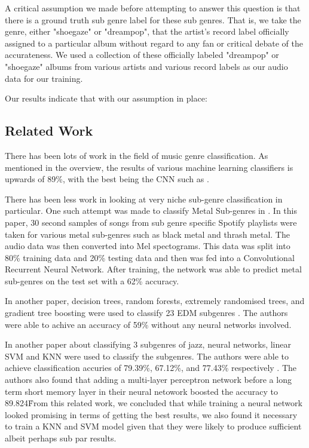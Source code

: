 \documentclass[letterpaper, 12 pt, conference]{ieeeconf}  %
\begin{document}
A critical assumption we made before attempting to answer this question is that there is a ground truth sub genre label for these sub genres. That is, we take the genre, either "shoegaze" or "dreampop", that the artist's record label officially assigned to a particular album without regard to any fan or critical debate of the accurateness. We used a collection of these officially labeled "dreampop" or "shoegaze" albums from various artists and various record labels as our audio data for our training.

Our results indicate that with our assumption in place: 




\subsection{Related Work}


There has been lots of work in the field of music genre classification. As mentioned in the overview, the results of various machine learning classifiers is upwards of 89\%, with the best being the CNN such as \cite{c4}. 

There has been less work in looking at very niche sub-genre classification in particular. One such attempt was made to classify Metal Sub-genres in \cite{c5}. In this paper, 30 second samples of songs from sub genre specific Spotify playlists were taken for various metal sub-genres such as black metal and thrash metal. The audio data was then converted into Mel spectograms. This data was split into 80\% training data and 20\% testing data and then was fed into a Convolutional Recurrent Neural Network. After training, the network was able to predict metal sub-genres on the test set with a 62\% accuracy. 

In another paper, decision trees, random forests, extremely randomised trees, and gradient tree boosting were used to classify 23 EDM subgenres \cite{c6}. The authors were able to achive an accuracy of 59\% without any neural networks involved.

In another paper about classifying 3 subgenres of jazz, neural networks, linear SVM and KNN were used to classify the subgenres. The authors were able to achieve classification accuries of 79.39\%, 67.12\%, and 77.43\%  respectively \cite{c7}. The authors also found that adding a multi-layer perceptron network before a long term short memory layer in their neural netowork boosted the accuracy to 89.824\.%

From this related work, we concluded that while training a neural network looked promising in terms of getting the best results, we also found it necessary to train a KNN and SVM model given that they were likely to produce sufficient albeit perhaps sub par results. 
\end{document}
